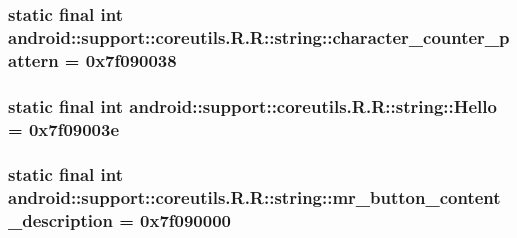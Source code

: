 \hypertarget{classandroid_1_1support_1_1coreutils_1_1_r_1_1string_ec63407b9c970fb86cd834c0e9921595}{
\subsubsection[{character\_\-counter\_\-pattern}]{\setlength{\rightskip}{0pt plus 5cm}static final int android::support::coreutils.R.R::string::character\_\-counter\_\-pattern = 0x7f090038}}
\label{classandroid_1_1support_1_1coreutils_1_1_r_1_1string_ec63407b9c970fb86cd834c0e9921595}


\hypertarget{classandroid_1_1support_1_1coreutils_1_1_r_1_1string_f32649b7f5f79162b9b060875a110c77}{
\subsubsection[{Hello}]{\setlength{\rightskip}{0pt plus 5cm}static final int android::support::coreutils.R.R::string::Hello = 0x7f09003e}}
\label{classandroid_1_1support_1_1coreutils_1_1_r_1_1string_f32649b7f5f79162b9b060875a110c77}


\hypertarget{classandroid_1_1support_1_1coreutils_1_1_r_1_1string_d5a5de091419c6204fd1cca07a274251}{
\subsubsection[{mr\_\-button\_\-content\_\-description}]{\setlength{\rightskip}{0pt plus 5cm}static final int android::support::coreutils.R.R::string::mr\_\-button\_\-content\_\-description = 0x7f090000}}
\label{classandroid_1_1support_1_1coreutils_1_1_r_1_1string_d5a5de091419c6204fd1cca07a274251}


